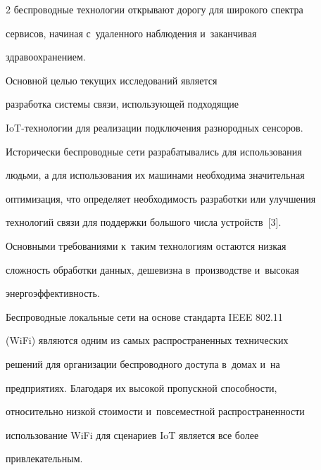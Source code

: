 \begin{multicols}{2}
беспроводные технологии открывают дорогу для широкого спектра 


сервисов, начиная с~удаленного наблюдения и~заканчивая 


здравоохранением. 





Основной целью текущих исследований является 


разработка системы связи, использующей подходящие  


IoT-тех\-но\-ло\-гии для реализации подключения разнородных сенсоров. 


{





}


    


    Исторически беспроводные сети разрабатывались для использования 


людьми, а для использования их машинами необходима значительная 


оптимизация, что определяет необходимость разработки или улучшения 


технологий связи для поддержки большого числа устройств~[3]. 


Основными требованиями к~таким технологиям остаются низкая 


сложность обработки данных, дешевизна в~производстве и~высокая 


энергоэффективность. 


    


    Беспроводные локальные сети на основе стандарта IEEE 802.11 


(WiFi) являются одним из самых распространенных технических 


решений для ор\-ганизации беспроводного доступа в~домах и~на 


предприятиях. Благодаря их высокой пропускной спо\-соб\-ности, 


относительно низкой сто\-и\-мости и~повсеместной распространенности 


использование WiFi для сценариев IoT является все более 


привлекательным. 





\begin{figure}[b] %


\vspace*{1pt}



\end{figure}
\end{multicols}
